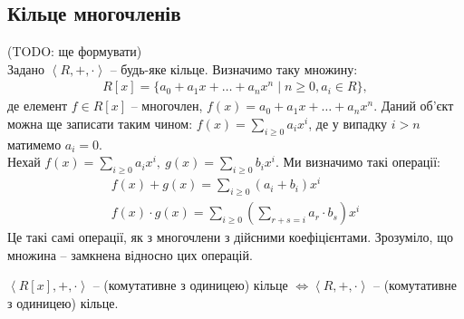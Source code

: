 \documentclass{math_library}
\begin{document}
\subsection{Кільце многочленів}
(TODO: ще формувати)
\bigskip \\
Задано $\left< R,+,\cdot \right>$ -- будь-яке кільце. Визначимо таку множину:
\begin{align*}
R[x] = \{a_0 + a_1 x + \dots + a_n x^n \mid n \geq 0, a_i \in R\},
\end{align*}
де елемент $f \in R[x]$ -- многочлен, $f(x) = a_0 + a_1 x + \dots + a_n x^n$. Даний об'єкт можна ще записати таким чином: $f(x) = \displaystyle\sum_{i \geq 0} a_i x^i$, де у випадку $i > n$ матимемо $a_i = 0$.\\
Нехай $f(x) = \displaystyle\sum_{i \geq 0} a_i x^i,\ g(x) =\sum_{i \geq 0} b_i x^i$. Ми визначимо такі операції:
\begin{align*}
f(x) + g(x) = \displaystyle\sum_{i \geq 0} (a_i + b_i) x^i \\
f(x) \cdot g(x) = \displaystyle\sum_{i \geq 0} \left(\sum_{r + s = i} a_r \cdot b_s \right) x^i
\end{align*}
Це такі самі операції, як з многочлени з дійсними коефіцієнтами. Зрозуміло, що множина -- замкнена відносно цих операцій.

\begin{theorem}
$\left<R[x],+,\cdot\right>$ -- (комутативне з одиницею) кільце $\iff \left< R,+,\cdot \right>$ -- (комутативне з одиницею) кільце.
\end{theorem}
\end{document}
